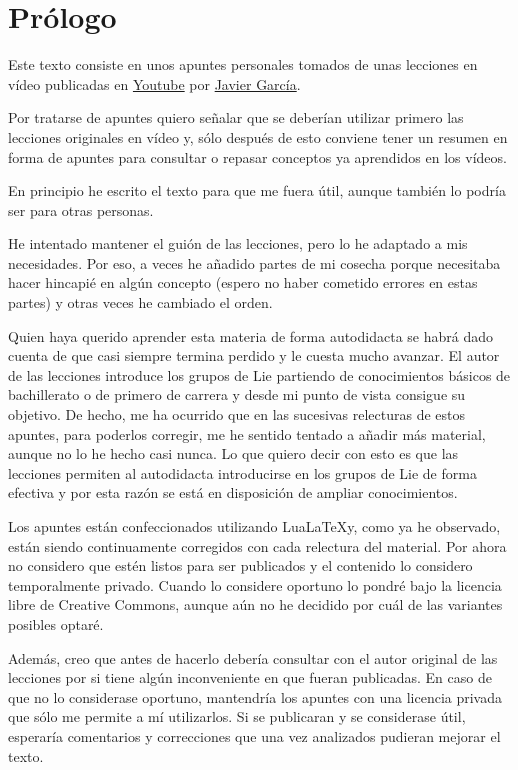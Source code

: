 \chapter{Prólogo}
Este texto consiste en unos apuntes personales tomados
de unas lecciones en vídeo publicadas en
\href{%
  https://www.youtube.com/watch?v=4NE-KNwHKSI\&list=PLAnA8FVrBl8DTFTMP8kXbDnRJHQKqfjaw
}
{Youtube}
por \href{https://www.patreon.com/JavierGarcia/}{Javier García}.

Por tratarse de apuntes quiero señalar que se deberían utilizar primero
las lecciones originales en vídeo y, sólo después de esto conviene tener
un resumen en forma de apuntes para consultar o repasar conceptos ya
aprendidos en los vídeos.

En principio he escrito el texto para que me fuera útil, aunque también lo
podría ser para otras personas.

He intentado mantener el guión de las lecciones, pero lo he adaptado a mis
necesidades. Por eso, a veces he añadido partes de mi cosecha porque necesitaba
hacer hincapié en algún concepto (espero no haber cometido errores en estas
partes) y otras veces he cambiado el orden.

Quien haya querido aprender esta materia de forma autodidacta se habrá
dado cuenta de que casi siempre termina perdido y le cuesta mucho avanzar.
El autor de las lecciones introduce los grupos de Lie partiendo de
conocimientos básicos de bachillerato o de primero de carrera y desde mi punto
de vista consigue su objetivo.
De hecho, me ha ocurrido que en las sucesivas relecturas de estos apuntes, para
poderlos corregir, me he sentido tentado a añadir más material, aunque no
lo he hecho casi nunca. Lo que quiero decir con esto es que las lecciones
permiten al autodidacta introducirse en los grupos de Lie de forma efectiva
y por esta razón se está en disposición de ampliar conocimientos.

Los apuntes están confeccionados utilizando Lua\LaTeX y, como ya he observado,
están siendo continuamente corregidos con cada relectura del material.
Por ahora no considero que estén listos para ser publicados y el contenido
lo considero temporalmente privado. Cuando lo considere oportuno lo pondré
bajo la licencia libre de Creative Commons, aunque aún no he decidido por
cuál de las variantes posibles optaré.

Además, creo que antes de hacerlo debería consultar con el autor original
de las lecciones por si tiene algún inconveniente en que fueran publicadas.
En caso de que no lo considerase oportuno, mantendría los apuntes con una
licencia privada que sólo me permite a mí utilizarlos. Si se publicaran
y se considerase útil, esperaría comentarios y correcciones que una
vez analizados pudieran mejorar el texto.


 
